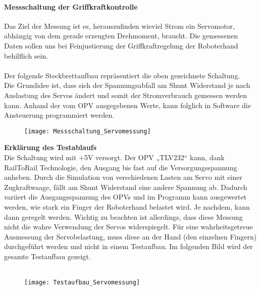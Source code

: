 \documentclass[titlepage,12pt,twoside]{article}
\begin{document}
\paragraph{Messschaltung der Griffkraftkontrolle}
\hfill \break
\hfill \break
Das Ziel der Messung ist es, herauszufinden wieviel Strom ein Servomotor, abhängig von dem gerade erzeugten Drehmoment, 
braucht. Die gemessenen Daten sollen uns bei Feinjustierung der Griffkraftregelung der Roboterhand behilflich sein. \\
\\
Der folgende Steckbrettaufbau repräsentiert die oben gezeichnete Schaltung. \\
Die Grundidee ist, dass sich der Spannungsabfall am Shunt Widerstand je nach Auslastung des Servos ändert und somit der 
Stromverbrauch gemessen werden kann. Anhand der vom OPV ausgegebenen Werte, kann folglich in Software die Ansteuerung programmiert 
werden. \\
\begin{figure}[H]
	\begin{center}
		\scalebox{1.2}
		{\texttt{[image: Messschaltung\_Servomessung]}}
	\end{center}
\end{figure}
\hfill \break
\textbf{Erklärung des Testablaufs}\\
Die Schaltung wird mit +5V versorgt. Der OPV „TLV232“ kann, dank RailToRail Technologie, den Ausgang bis fast auf die 
Versorgungsspannung anheben. Durch die Simulation von verschiedenen Lasten am Servo mit einer Zugkraftwaage, fällt am Shunt 
Widerstand eine andere Spannung ab. Dadurch variiert die Ausgangsspannung des OPVs und im Programm kann ausgewertet werden, 
wie stark ein Finger der Roboterhand belastet wird. Je nachdem, kann dann geregelt werden. 
Wichtig zu beachten ist allerdings, dass diese Messung nicht die wahre Verwendung der Servos widerspiegelt. Für eine 
wahrheitsgetreue Ausmessung der Servobelastung, muss diese an der Hand (den einzelnen Fingern) durchgeführt werden und nicht 
in einem Testaufbau. Im folgenden Bild wird der gesamte Testaufbau gezeigt. \\
\\
\begin{figure}[H]
	\begin{center}
		\scalebox{1.2}
		{\texttt{[image: Testaufbau\_Servomessung]}}
	\end{center}
\end{figure}
\end{document}
